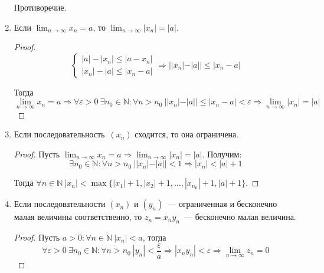 \begin{enumerate}
\begin{proofcontra}
	Противоречие.
	\end{proofcontra}
	
	\item Если $\displaystyle \lim_{n \to \infty} x_n = a$, то $\displaystyle \lim_{n \to \infty} |x_n| = |a|$.
	\begin{proof}
	\begin{equation*}
	\begin{cases}
	|a| - |x_n| \leqslant |a - x_n| \\
	|x_n| - |a| \leqslant |x_n - a|
	\end{cases}
	\Rightarrow ||x_n| - |a|| \leqslant |x_n - a|
	\end{equation*}
	
	Тогда
	\begin{equation*}
	\lim_{n \to \infty} x_n = a \Rightarrow
	\forall \varepsilon > 0 \ \exists n_0 \in \mathbb N \colon \forall n > n_0 \ ||x_n| - |a|| \leqslant |x_n - a| < \varepsilon \Rightarrow
	\lim_{n \to \infty} |x_n| = |a|
	\end{equation*}
	\end{proof}
	
	\item Если последовательность~$(x_n)$ сходится, то она ограничена.
	\begin{proof}
	Пусть $\displaystyle \lim_{n \to \infty} x_n = a \Rightarrow \lim_{n \to \infty} |x_n| = |a|$.
	Получим:
	\begin{equation*}
	\exists n_0 \in \mathbb N \colon \forall n > n_0 \ ||x_n| - |a|| < 1 \Rightarrow |x_n| < |a| + 1
	\end{equation*}
	
	Тогда $\forall n \in \mathbb N \ |x_n| < \max \{ |x_1| + 1, |x_2| + 1, \ldots, |x_{n_0}| + 1, |a| + 1 \}$.
	\end{proof}
	
	\item Если последовательности $(x_n)$ и $(y_n)$~--- ограниченная и бесконечно малая величины соответственно, то $z_n = x_n y_n$~--- бесконечно малая величина.
	\begin{proof}
	Пусть $a > 0 \colon \forall n \in \mathbb N \ |x_n| < a$, тогда
	\begin{equation*}
	\forall \varepsilon > 0 \ \exists n_0 \in \mathbb N \colon
	\forall n > n_0 \ |y_n| < \frac\varepsilon{a} \Rightarrow
	|x_n y_n| < \varepsilon \Rightarrow
	\lim_{n \to \infty} z_n = 0
	\end{equation*}
	\end{proof}
	

\end{enumerate}
